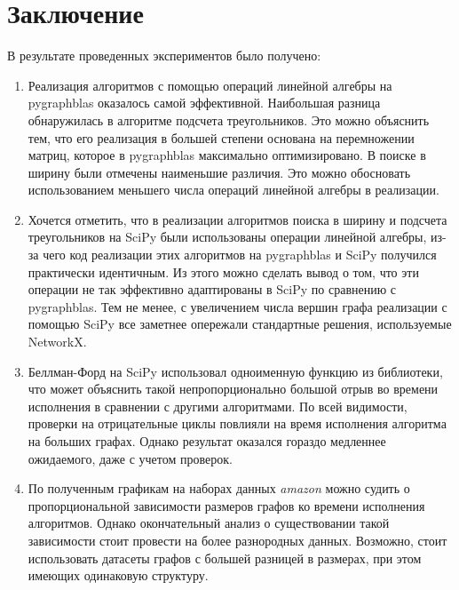 \clearpage
\section{Заключение}

В результате проведенных экспериментов было получено:

\begin{enumerate}
    \item Реализация алгоритмов с помощью операций линейной алгебры на pygraphblas оказалось самой эффективной. 
    Наибольшая разница обнаружилась в алгоритме подсчета треугольников. Это можно объяснить тем, что его реализация 
    в большей степени основана на перемножении матриц, которое в pygraphblas максимально оптимизировано.
    В поиске в ширину были отмечены наименьшие различия. Это можно обосновать использованием меньшего числа операций 
    линейной алгебры в реализации.
    
    \item Хочется отметить, что в реализации алгоритмов поиска в ширину и подсчета треугольников на SciPy были использованы 
    операции линейной алгебры, из-за чего код реализации этих алгоритмов на pygraphblas и SciPy получился практически идентичным. 
    Из этого можно сделать вывод о том, что эти операции не так эффективно адаптированы в SciPy по сравнению с pygraphblas. 
    Тем не менее, с увеличением числа вершин графа реализации с помощью SciPy все заметнее опережали стандартные решения, 
    используемые NetworkX. 
    
    \item Беллман-Форд на SciPy использовал одноименную функцию из библиотеки\cite{csgraph}, что может объяснить такой 
    непропорционально большой отрыв во времени исполнения в сравнении с другими алгоритмами. По всей видимости, проверки 
    на отрицательные циклы повлияли на время исполнения алгоритма на больших графах. Однако результат оказался гораздо 
    медленнее ожидаемого, даже с учетом проверок.
    
    \item По полученным графикам на наборах данных \textit{amazon} можно судить о пропорциональной зависимости размеров 
    графов ко времени исполнения алгоритмов. Однако окончательный анализ о существовании такой зависимости стоит провести 
    на более разнородных данных. Возможно, стоит использовать датасеты графов с большей разницей в размерах, при этом имеющих 
    одинаковую структуру.
\end{enumerate}
\clearpage